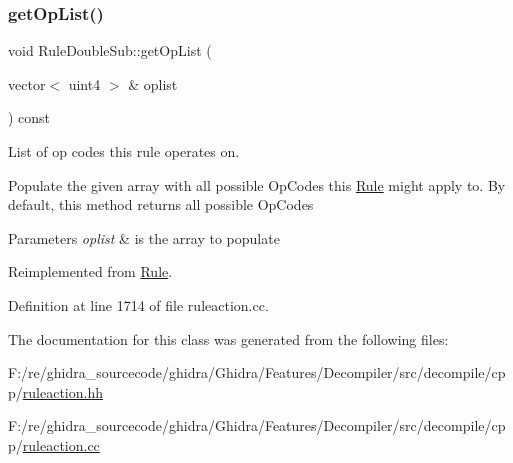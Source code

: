 \subsubsection{\texorpdfstring{getOpList()}{getOpList()}}
{\footnotesize\ttfamily void Rule\+Double\+Sub\+::get\+Op\+List (\begin{DoxyParamCaption}\item[{vector$<$ uint4 $>$ \&}]{oplist }\end{DoxyParamCaption}) const\hspace{0.3cm}{\ttfamily [virtual]}}



List of op codes this rule operates on. 

Populate the given array with all possible Op\+Codes this \mbox{\hyperlink{class_rule}{Rule}} might apply to. By default, this method returns all possible Op\+Codes 
\begin{DoxyParams}{Parameters}
{\em oplist} & is the array to populate \\
\hline
\end{DoxyParams}


Reimplemented from \mbox{\hyperlink{class_rule_a4023bfc7825de0ab866790551856d10e}{Rule}}.



Definition at line 1714 of file ruleaction.\+cc.



The documentation for this class was generated from the following files\+:\begin{DoxyCompactItemize}
\item 
F\+:/re/ghidra\+\_\+sourcecode/ghidra/\+Ghidra/\+Features/\+Decompiler/src/decompile/cpp/\mbox{\hyperlink{ruleaction_8hh}{ruleaction.\+hh}}\item 
F\+:/re/ghidra\+\_\+sourcecode/ghidra/\+Ghidra/\+Features/\+Decompiler/src/decompile/cpp/\mbox{\hyperlink{ruleaction_8cc}{ruleaction.\+cc}}\end{DoxyCompactItemize}
